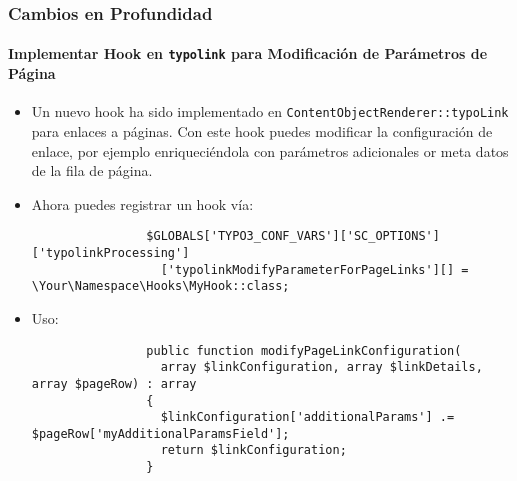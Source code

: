 \begin{frame}[fragile]
	\frametitle{Cambios en Profundidad}
	\framesubtitle{Implementar Hook en \texttt{typolink} para Modificación de Parámetros de Página}

	\lstset{basicstyle=\tiny\ttfamily}

	\begin{itemize}
		\item Un nuevo hook ha sido implementado en \texttt{ContentObjectRenderer::typoLink} para enlaces a páginas.
			Con este hook puedes modificar la configuración de enlace, por ejemplo enriqueciéndola con parámetros
			adicionales or meta datos de la fila de página.

		\item Ahora puedes registrar un hook vía:

			\begin{lstlisting}
				$GLOBALS['TYPO3_CONF_VARS']['SC_OPTIONS']['typolinkProcessing']
				  ['typolinkModifyParameterForPageLinks'][] = \Your\Namespace\Hooks\MyHook::class;
			\end{lstlisting}

		\item Uso:

			\begin{lstlisting}
				public function modifyPageLinkConfiguration(
				  array $linkConfiguration, array $linkDetails, array $pageRow) : array
				{
				  $linkConfiguration['additionalParams'] .= $pageRow['myAdditionalParamsField'];
				  return $linkConfiguration;
				}
			\end{lstlisting}

	\end{itemize}

\end{frame}


